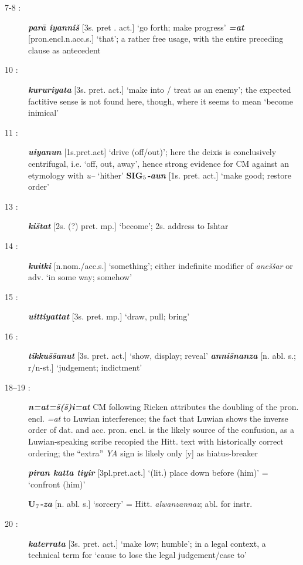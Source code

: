 \documentclass[10pt]{article}
\newcommand{\subsc}[1]{$_{\textrm{\scriptsize{#1}}}$}	%
\newcommand{\bit}[1]{\textbf{\textit{#1}}}				%
\newcommand{\p}[1]{{\tiny[{#1}]}}					%
\newcommand{\hith}{\textsubwedge{h}}
\newcommand{\Hith}{\textsubwedge{H}}
\renewcommand{\.}[1]{\textsubdot{#1}}
\begin{document}
\begin{description}
\item[7-8 :] \bit{par\=a iyanni\v{s}} \p{3s. pret . act.} `go forth; make progress' \bit{=at} \p{pron.encl.n.acc.s.} `that'; a rather free usage, with the entire preceding clause as antecedent

\item[10 :] \bit{kururiya{\hith}ta} \p{3s. pret. act.} `make into / treat as an enemy'; the expected factitive sense is not found here, though, where it seems to mean `become inimical'

\item[11 :] \bit{uiyanun} \p{1s.pret.act} `drive (off/out)'; here the deixis is conclusively centrifugal, i.e. `off, out, away', hence strong evidence for CM against an etymology with \textit{u--} `hither' \textbf{SIG\subsc{5}}\bit{-a{\hith\hith}un} \p{1s. pret. act.} `make good; restore order'

\item[13 :] \bit{ki\v{s}tat} \p{2s. (?) pret. mp.} `become'; 2s. address to Ishtar

\item[14 :] \bit{kuitki} \p{n.nom./acc.s.} `something'; either indefinite modifier of \textit{{\hith}ane\v{s}\v{s}ar} or adv. `in some way; somehow'

\item[15 :] \bit{{\hith}uittiyattat} \p{3s. pret. mp.} `draw, pull; bring' 

\item[16 :] \bit{tikku\v{s}\v{s}anut} \p{3s. pret. act.} `show, display; reveal' \bit{{\hith}anni\v{s}nanza} \p{n. abl. s.; r/n-st.} `judgement; indictment'

\item[18--19 :] \bit{n=at=\v{s}(\v{s})i=at} CM following Rieken attributes the doubling of the pron. encl. \textit{=at} to Luwian interference; the fact that Luwian shows the inverse order of dat. and acc. pron. encl. is the likely source of the confusion, as a Luwian-speaking scribe recopied the Hitt. text with historically correct ordering; the ``extra'' \textit{YA} sign is likely only [y] as hiatus-breaker 

\bit{piran katta tiyir} \p{3pl.pret.act.} `(lit.) place down before (him)' = `confront (him)'

\textbf{U{\Hith}\subsc{7}}\bit{-za} \p{n. abl. s.} `sorcery' = Hitt. \textit{alwanzannaz}; abl. for instr.

\item[20 :] \bit{katerra{\hith}ta} \p{3s. pret. act.} `make low; humble'; in a legal context, a technical term for `cause to lose the legal judgement/case to'


\end{description}
\end{document}
